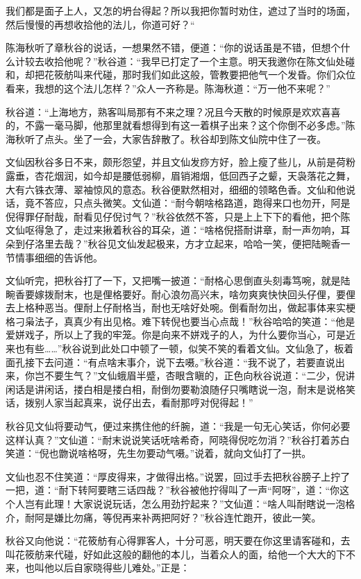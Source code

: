 \documentclass[12pt,UTF8]{ctexbook}
\begin{document}
{{{我们都是面子上人，又怎的坍台得起？所以我把你暂时劝住，遮过了当时的场面，然后慢慢的再想收拾他的法儿，你道可好？“

陈海秋听了章秋谷的说话，一想果然不错，便道：“你的说话虽是不错，但想个什么计较去收拾他呢？”秋谷道：“我早已打定了一个主意。明天我邀你在陈文仙处碰和，却把花筱舫叫来代碰，那时我们如此这般，管教要把他气一个发昏。你们众位看来，我想的这个法儿怎样？”众人一齐称是。陈海秋道：“万一他不来呢？”

秋谷道：“上海地方，熟客叫局那有不来之理？况且今天散的时候原是欢欢喜喜的，不露一毫马脚，他那里就看想得到有这一着棋子出来？这个你倒不必多虑。”陈海秋听了点头。坐了一会，大家告辞散了。秋谷却到陈文仙院中住了一夜。

文仙因秋谷多日不来，颇形怨望，并且文仙发痧方好，脸上瘦了些儿，从前是荷粉露垂，杏花烟润，如今却是腰低弱柳，眉销湘烟，低回西子之颦，天袅落花之舞，大有六铢衣薄、翠袖惊风的意态。秋谷便默然相对，细细的领略色香。文仙和他说话，竟不答应，只点头微笑。文仙道：“耐今朝啥格路道，跑得来口也勿开，阿是倪得罪仔耐哉，耐看见仔倪讨气？”秋谷依然不答，只是上上下下的看他，把个陈文仙呕得急了，走过来揪着秋谷的耳朵，道：“啥格倪搭耐讲章，耐一声勿响，耳朵到仔洛里去哉？”秋谷见文仙发起极来，方才立起来，哈哈一笑，便把陆畹香一节情事细细的告诉他。

文仙听完，把秋谷打了一下，又把嘴一披道：“耐格心思倒直头刻毒笃啘，就是陆畹香要嫁拨耐末，也是俚格要好。耐心浪勿高兴末，啥勿爽爽快快回头仔俚，要俚去上格种恶当。俚耐上仔耐格当，耐也无啥好处啘。倒看耐勿出，做起事体来实梗格刁枭法子，真真少有出见格。难下转倪也要当心点哉！”秋谷哈哈的笑道：“他是爱姘戏子，所以上了我的牢笼。你是向来不姘戏子的人，为什么要你当心，可是近来也有些……”秋谷说到此处口中顿了一顿，似笑不笑的看着文仙。文仙急了，板着面孔接下去问道：“有点啥末事介，说下去嗫。”秋谷道：“我不说了，若要直说出来，你岂不要生气？”文仙蛾眉半蹙，杏眼含瞋的，正色向秋谷说道：“二少，倪讲闲话是讲闲话，搂白相是搂白相，耐倒勿要勒浪随仔只嘴瞎说一泡，耐末是说格笑话，拨别人家当起真来，说仔出去，看耐那哼对倪得起！”

秋谷见文仙将要动气，便过来携住他的纤腕，道：“我是一句无心笑话，你何必要这样认真？”文仙道：“耐末说说笑话呒啥希奇，阿晓得倪吃勿消？”秋谷打着苏白笑道：“倪也朆说啥格呀，先生勿要动气嗫。”说着，就向文仙打了一拱。

文仙也忍不住笑道：“厚皮得来，才做得出格。”说罢，回过手去把秋谷膀子上拧了一把，道：“耐下转阿要瞎三话四哉？”秋谷被他拧得叫了一声“阿呀”，道：“你这个人岂有此理！大家说说玩话，怎么用劲拧起来？”文仙道：“啥人叫耐瞎说一泡格介，耐阿是嫌比勿痛，等倪再来补两把阿好？”秋谷连忙跑开，彼此一笑。

秋谷又向他说：“花筱舫有心得罪客人，十分可恶，明天要在你这里请客碰和，去叫花筱舫来代碰，好如此这般的翻他的本儿，当着众人的面，给他一个大大的下不来，也叫他以后自家晓得些儿难处。”正是：

}}}
\end{document}
